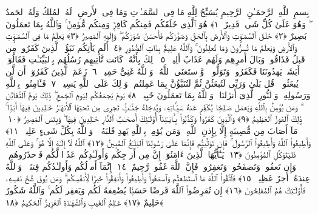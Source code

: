
  
    
  
    
    

\nopagebreak
  بِسمِ ٱللَّهِ ٱلرَّحمَـٰنِ ٱلرَّحِيمِ
  يُسَبِّحُ لِلَّهِ مَا فِى ٱلسَّمَـٰوَٟتِ وَمَا فِى ٱلأَرضِ ۖ لَهُ ٱلمُلكُ وَلَهُ ٱلحَمدُ ۖ وَهُوَ عَلَىٰ كُلِّ شَىءٍۢ قَدِيرٌ ﴿١﴾
 هُوَ ٱلَّذِى خَلَقَكُم فَمِنكُم كَافِرٌۭ وَمِنكُم مُّؤمِنٌۭ ۚ وَٱللَّهُ بِمَا تَعمَلُونَ بَصِيرٌ ﴿٢﴾
 خَلَقَ ٱلسَّمَـٰوَٟتِ وَٱلأَرضَ بِٱلحَقِّ وَصَوَّرَكُم فَأَحسَنَ صُوَرَكُم ۖ وَإِلَيهِ ٱلمَصِيرُ ﴿٣﴾
 يَعلَمُ مَا فِى ٱلسَّمَـٰوَٟتِ وَٱلأَرضِ وَيَعلَمُ مَا تُسِرُّونَ وَمَا تُعلِنُونَ ۚ وَٱللَّهُ عَلِيمٌۢ بِذَاتِ ٱلصُّدُورِ ﴿٤﴾
 أَلَم يَأتِكُم نَبَؤُا۟ ٱلَّذِينَ كَفَرُوا۟ مِن قَبلُ فَذَاقُوا۟ وَبَالَ أَمرِهِم وَلَهُم عَذَابٌ أَلِيمٌۭ ﴿٥﴾
 ذَٟلِكَ بِأَنَّهُۥ كَانَت تَّأتِيهِم رُسُلُهُم بِٱلبَيِّنَـٰتِ فَقَالُوٓا۟ أَبَشَرٌۭ يَهدُونَنَا فَكَفَرُوا۟ وَتَوَلَّوا۟ ۚ وَّٱستَغنَى ٱللَّهُ ۚ وَٱللَّهُ غَنِىٌّ حَمِيدٌۭ ﴿٦﴾
 زَعَمَ ٱلَّذِينَ كَفَرُوٓا۟ أَن لَّن يُبعَثُوا۟ ۚ قُل بَلَىٰ وَرَبِّى لَتُبعَثُنَّ ثُمَّ لَتُنَبَّؤُنَّ بِمَا عَمِلتُم ۚ وَذَٟلِكَ عَلَى ٱللَّهِ يَسِيرٌۭ ﴿٧﴾
 فَـَٔامِنُوا۟ بِٱللَّهِ وَرَسُولِهِۦ وَٱلنُّورِ ٱلَّذِىٓ أَنزَلنَا ۚ وَٱللَّهُ بِمَا تَعمَلُونَ خَبِيرٌۭ ﴿٨﴾
 يَومَ يَجمَعُكُم لِيَومِ ٱلجَمعِ ۖ ذَٟلِكَ يَومُ ٱلتَّغَابُنِ ۗ وَمَن يُؤمِنۢ بِٱللَّهِ وَيَعمَل صَـٰلِحًۭا يُكَفِّر عَنهُ سَيِّـَٔاتِهِۦ وَيُدخِلهُ جَنَّـٰتٍۢ تَجرِى مِن تَحتِهَا ٱلأَنهَـٰرُ خَـٰلِدِينَ فِيهَآ أَبَدًۭا ۚ ذَٟلِكَ ٱلفَوزُ ٱلعَظِيمُ ﴿٩﴾
 وَٱلَّذِينَ كَفَرُوا۟ وَكَذَّبُوا۟ بِـَٔايَـٰتِنَآ أُو۟لَـٰٓئِكَ أَصحَـٰبُ ٱلنَّارِ خَـٰلِدِينَ فِيهَا ۖ وَبِئسَ ٱلمَصِيرُ ﴿١٠﴾
 مَآ أَصَابَ مِن مُّصِيبَةٍ إِلَّا بِإِذنِ ٱللَّهِ ۗ وَمَن يُؤمِنۢ بِٱللَّهِ يَهدِ قَلبَهُۥ ۚ وَٱللَّهُ بِكُلِّ شَىءٍ عَلِيمٌۭ ﴿١١﴾
 وَأَطِيعُوا۟ ٱللَّهَ وَأَطِيعُوا۟ ٱلرَّسُولَ ۚ فَإِن تَوَلَّيتُم فَإِنَّمَا عَلَىٰ رَسُولِنَا ٱلبَلَـٰغُ ٱلمُبِينُ ﴿١٢﴾
 ٱللَّهُ لَآ إِلَـٰهَ إِلَّا هُوَ ۚ وَعَلَى ٱللَّهِ فَليَتَوَكَّلِ ٱلمُؤمِنُونَ ﴿١٣﴾
 يَـٰٓأَيُّهَا ٱلَّذِينَ ءَامَنُوٓا۟ إِنَّ مِن أَزوَٟجِكُم وَأَولَـٰدِكُم عَدُوًّۭا لَّكُم فَٱحذَرُوهُم ۚ وَإِن تَعفُوا۟ وَتَصفَحُوا۟ وَتَغفِرُوا۟ فَإِنَّ ٱللَّهَ غَفُورٌۭ رَّحِيمٌ ﴿١٤﴾
 إِنَّمَآ أَموَٟلُكُم وَأَولَـٰدُكُم فِتنَةٌۭ ۚ وَٱللَّهُ عِندَهُۥٓ أَجرٌ عَظِيمٌۭ ﴿١٥﴾
 فَٱتَّقُوا۟ ٱللَّهَ مَا ٱستَطَعتُم وَٱسمَعُوا۟ وَأَطِيعُوا۟ وَأَنفِقُوا۟ خَيرًۭا لِّأَنفُسِكُم ۗ وَمَن يُوقَ شُحَّ نَفسِهِۦ فَأُو۟لَـٰٓئِكَ هُمُ ٱلمُفلِحُونَ ﴿١٦﴾
 إِن تُقرِضُوا۟ ٱللَّهَ قَرضًا حَسَنًۭا يُضَٰعِفهُ لَكُم وَيَغفِر لَكُم ۚ وَٱللَّهُ شَكُورٌ حَلِيمٌ ﴿١٧﴾
 عَـٰلِمُ ٱلغَيبِ وَٱلشَّهَـٰدَةِ ٱلعَزِيزُ ٱلحَكِيمُ ﴿١٨﴾
 

